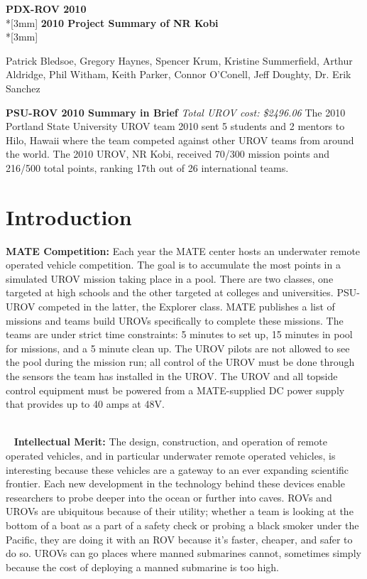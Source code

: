 \documentclass{proposalnsf}
\begin{document}
\begin{center}
{\Large{\bf PDX-ROV 2010}}\\*[3mm]
{\bf 2010 Project Summary of NR Kobi} \\*[3mm]

Patrick Bledsoe, Gregory Haynes, Spencer Krum, Kristine Summerfield, Arthur Aldridge, Phil Witham, Keith Parker, Connor O'Conell, Jeff Doughty, Dr. Erik Sanchez

\end{center}

\noindent
{\bf PSU-ROV 2010 Summary in Brief}
{\it Total UROV cost: \$2496.06}
The 2010 Portland State University UROV team 2010 sent 5 students and 2 mentors to Hilo, Hawaii where the team competed against other UROV teams from around the world. The 2010 UROV, NR Kobi, received 70/300 mission points and 216/500 total points, 
ranking 17th out of 26 international teams.


\section{Introduction}
\noindent
{\bf MATE Competition:}
Each year the MATE center hosts an underwater remote operated vehicle competition. The goal is to accumulate the most points
in a simulated UROV mission taking place in a pool. There are two classes, one targeted at high schools and 
the other targeted at colleges and universities. PSU-UROV competed in the latter, the Explorer class. MATE 
publishes a list of missions and teams build UROVs specifically to complete these missions. The teams are under strict
 time constraints: 5 minutes to set up, 15 minutes in pool for missions, and a 5 minute clean up. The UROV pilots are not allowed to see the pool during the mission run; all 
control of the UROV must be done through the sensors the team has installed in the UROV. The UROV and all topside control equipment must be 
powered from a MATE-supplied DC power supply that provides up to 40 amps at 48V.

\ \\\ 
\noindent
{\bf Intellectual Merit:}
The design, construction, and operation of remote operated vehicles, and in particular underwater remote operated vehicles, is interesting
because these vehicles are a gateway to an ever expanding scientific frontier. Each new development in the technology behind these devices enable 
researchers to probe deeper into the ocean or further into caves. ROVs and UROVs are ubiquitous because 
of their utility; whether a team is looking at the bottom of a boat as a part of a safety check or probing a black smoker under the Pacific, 
they are doing it with an ROV because it's faster, cheaper, and safer to do so. UROVs can go places where manned submarines cannot, sometimes 
simply because the cost of deploying a manned submarine is too high.  
\ \\
\end{document}
